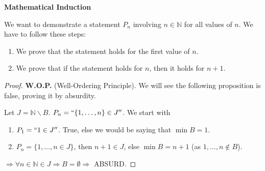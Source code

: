 \documentclass[12pt, a4paper]{book}
\begin{document}
\begin{defn}
  \textbf{Mathematical Induction}

  We want to demonstrate a statement $P_n$ involving $n\in\mathbb{N}$ for all values of $n$. We have to follow these steps:
  \begin{enumerate}[label=\emph{\alph*})]
    \item We prove that the statement holds for the first value of $n$.
    \item We prove that if the statement holds for $n$, then it holds for $n+1$.
  \end{enumerate}
\end{defn}

\begin{exmp}
  \begin{proof}
    \textbf{W.O.P.} (Well-Ordering Principle). We will see the following proposition is false, proving it by absurdity.

    Let $J = \mathbb{N} \backslash B$. $P_n = ``\{1,\ldots,n\} \in J''$. We start with
    \begin{enumerate}[label=\emph{\alph*})]
      \item $P_1 = ``1 \in J''$. True, else we would be saying that $\min B = 1$.
      \item $P_n = \{1,\ldots,n \in J\}$, then $n+1 \in J$, else $\min B = n+1$ (as $1,\ldots,n \notin B$).
    \end{enumerate}
    $\Rightarrow \forall n\in\mathbb{N}\in J \Rightarrow B = \emptyset \Rightarrow$ ABSURD.
  \end{proof}
\end{exmp}
\end{document}
